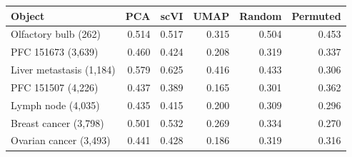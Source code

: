 \begin{tabular}{lrrrrr}
\toprule
Object & PCA & scVI & UMAP & Random & Permuted \\
\midrule
Olfactory bulb (262) & 0.514 & 0.517 & 0.315 & 0.504 & 0.453 \\
PFC 151673 (3{,}639) & 0.460 & 0.424 & 0.208 & 0.319 & 0.337 \\
Liver metastasis (1{,}184) & 0.579 & 0.625 & 0.416 & 0.433 & 0.306 \\
PFC 151507 (4{,}226) & 0.437 & 0.389 & 0.165 & 0.301 & 0.362 \\
Lymph node (4{,}035) & 0.435 & 0.415 & 0.200 & 0.309 & 0.296 \\
Breast cancer (3{,}798) & 0.501 & 0.532 & 0.269 & 0.334 & 0.270 \\
Ovarian cancer (3{,}493) & 0.441 & 0.428 & 0.186 & 0.319 & 0.316 \\
\bottomrule
\end{tabular}
